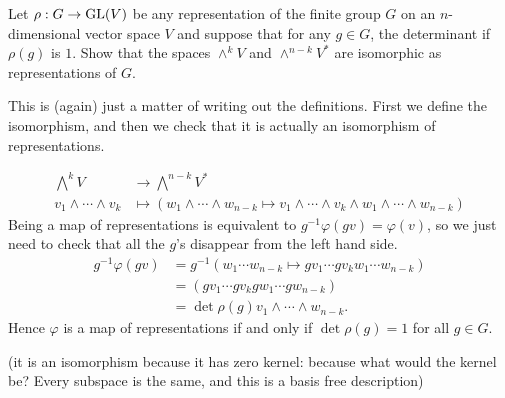 \documentclass[11pt, english]{article}
\begin{document}
\begin{exc}[Exercise 1.3]
Let $\rho:G \to \operatorname{GL}(V)$ be any representation of the finite group $G$ on an $n$-dimensional vector space $V$ and suppose that for any $g \in G$, the determinant if $\rho(g)$ is $1$. Show that the spaces $\wedge^k V $ and $\wedge^{n-k} V^\ast$ are isomorphic as representations of $G$.
\end{exc}

\begin{sol}
This is (again) just a matter of writing out the definitions. First we define the isomorphism, and then we check that it is actually an isomorphism of representations.

\begin{align*}
\bigwedge ^k V &\to \bigwedge^{n-k} V^\ast \\
v_1 \wedge \cdots \wedge v_k &\mapsto \left( w_1 \wedge \cdots \wedge w_{n-k} \mapsto v_1 \wedge \cdots \wedge v_k \wedge w_1 \wedge \cdots \wedge w_{n-k} \right)
\end{align*}
Being a map of representations is equivalent to $g^{-1}\varphi(gv)=\varphi(v)$, so we just need to check that all the $g$'s disappear from the left hand side. 
\begin{align*}
g^{-1}\varphi(gv) &= g^{-1}(w_1\cdots w_{n-k} \mapsto gv_1\cdots gv_k w_1 \cdots w_{n-k}) \\
&= (gv_1\cdots gv_k gw_1 \cdots gw_{n-k}) \\
&= \det \rho(g) v_1 \wedge \cdots \wedge w_{n-k}.
\end{align*}
Hence $\varphi$ is a map of representations if and only if $\det \rho(g)=1$ for all $g \in G$. 

(it is an isomorphism because it has zero kernel: because what would the kernel be? Every subspace is the same, and this is a basis free description)
\end{sol}
\end{document}

